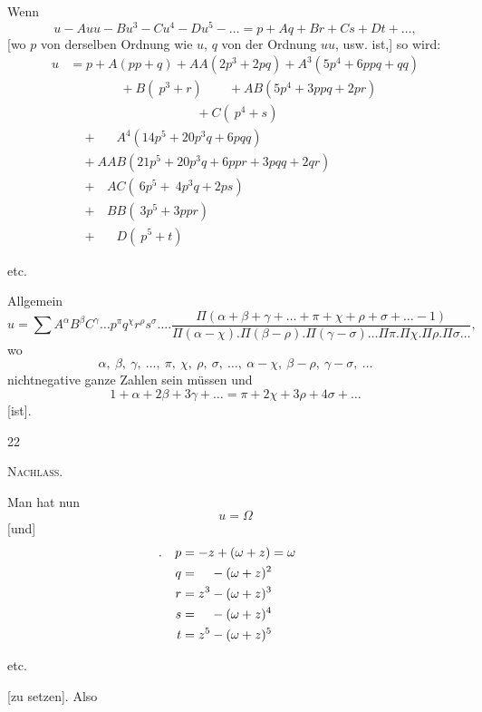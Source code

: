 Wenn
\[
u-Auu-Bu^3-Cu^4-Du^5-\ldots=p+Aq+Br+Cs+Dt+\ldots,
\]
[wo $p$ von derselben Ordnung wie $u$, $q$ von der Ordnung $uu$, usw. ist,] so wird:
\[
\begin{aligned}
u&=p+A(pp+q)+AA(2p^3+2pq)+A^3(5p^4+6ppq+qq)\\
&\qquad\qquad+B(\ p^3+r)\qquad+AB(5p^4+3ppq+2pr)\\
&\qquad\qquad\qquad\qquad\qquad+C(\ p^4+s)\\
&\quad+\phantom{AA}A^4(14p^5+20p^3q+6pqq)\\
&\quad+AAB(21p^5+20p^3q+6ppr+3pqq+2qr)\\
&\quad+\phantom{A}AC(\ 6p^5+\ 4p^3q+2ps)\\
&\quad+\phantom{A}BB(\ 3p^5+3ppr)\\
&\quad+\phantom{AA}D(\ p^5+t)
\end{aligned}
\]
\begin{center}etc.\end{center}
Allgemein
\[
u=\sum A^\alpha B^\beta C^\gamma\ldots p^\pi q^\chi r^\rho s^\sigma\ldots.
\frac{\Pi(\alpha+\beta+\gamma+\ldots+\pi+\chi+\rho+\sigma+\ldots-1)}{\Pi(\alpha-\chi).\Pi(\beta-\rho).\Pi(\gamma-\sigma)\ldots\Pi\pi.\Pi\chi.\Pi\rho.\Pi\sigma\ldots},
\]
wo
\[
\alpha,\ \beta,\ \gamma,\ \ldots,\ \pi,\ \chi,\ \rho,\ \sigma,\ \ldots,\ \alpha-\chi,\ \beta-\rho,\ \gamma-\sigma,\ \ldots
\]
nichtnegative ganze Zahlen sein müssen und
\[
1+\alpha+2\beta+3\gamma+\ldots=\pi+2\chi+3\rho+4\sigma+\ldots
\]
[ist].
\par\endgroup
\vfill{}\hfill22\hspace*{2cm}\par
\clearpage
{}\hfill\textsc{Nachlass.}\hfill\mbox{}\par\medskip
Man hat nun
\[
u=\Omega
\]
[und]
\[
\begin{aligned}
\rlap{\hspace{-1.3em}.}p&=-z+(\omega+z)=\omega\\
q&=\phantom{z^3}-(\omega+z)^2\\
r&=z^3-(\omega+z)^3\\
s&=\phantom{z^3}-(\omega+z)^4\\
t&=z^5-(\omega+z)^5
\end{aligned}
\]
\begin{center}etc.\end{center}
\noindent{}[zu setzen]. Also
\begingroup\small

